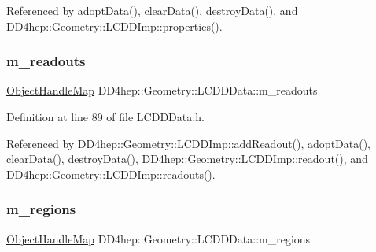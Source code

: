 Referenced by adopt\+Data(), clear\+Data(), destroy\+Data(), and D\+D4hep\+::\+Geometry\+::\+L\+C\+D\+D\+Imp\+::properties().

\hypertarget{class_d_d4hep_1_1_geometry_1_1_l_c_d_d_data_a75b8c8f3d2ebb4dd5dac3a90d297ca11}{}\label{class_d_d4hep_1_1_geometry_1_1_l_c_d_d_data_a75b8c8f3d2ebb4dd5dac3a90d297ca11} 
\subsubsection{\texorpdfstring{m\+\_\+readouts}{m\_readouts}}
{\footnotesize\ttfamily \hyperlink{class_d_d4hep_1_1_geometry_1_1_l_c_d_d_data_1_1_object_handle_map}{Object\+Handle\+Map} D\+D4hep\+::\+Geometry\+::\+L\+C\+D\+D\+Data\+::m\+\_\+readouts\hspace{0.3cm}{\ttfamily [protected]}}



Definition at line 89 of file L\+C\+D\+D\+Data.\+h.



Referenced by D\+D4hep\+::\+Geometry\+::\+L\+C\+D\+D\+Imp\+::add\+Readout(), adopt\+Data(), clear\+Data(), destroy\+Data(), D\+D4hep\+::\+Geometry\+::\+L\+C\+D\+D\+Imp\+::readout(), and D\+D4hep\+::\+Geometry\+::\+L\+C\+D\+D\+Imp\+::readouts().

\hypertarget{class_d_d4hep_1_1_geometry_1_1_l_c_d_d_data_af1b776d5f35d48149a80e6d705984788}{}\label{class_d_d4hep_1_1_geometry_1_1_l_c_d_d_data_af1b776d5f35d48149a80e6d705984788} 
\subsubsection{\texorpdfstring{m\+\_\+regions}{m\_regions}}
{\footnotesize\ttfamily \hyperlink{class_d_d4hep_1_1_geometry_1_1_l_c_d_d_data_1_1_object_handle_map}{Object\+Handle\+Map} D\+D4hep\+::\+Geometry\+::\+L\+C\+D\+D\+Data\+::m\+\_\+regions\hspace{0.3cm}{\ttfamily [protected]}}



